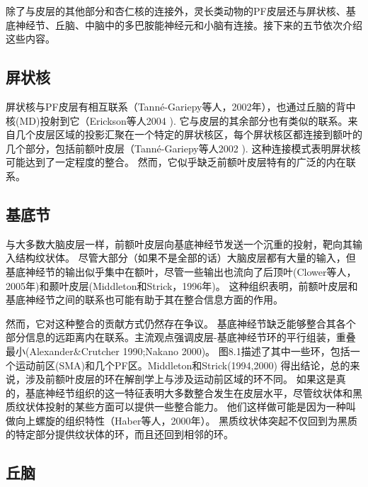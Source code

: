 除了与皮层的其他部分和杏仁核的连接外，灵长类动物的PF皮层还与屏状核、基底神经节、丘脑、中脑中的多巴胺能神经元和小脑有连接。接下来的五节依次介绍这些内容。



\subsection{屏状核}
\par

屏状核与PF皮层有相互联系（Tanné-Gariepy等人，2002年），也通过丘脑的背中核(MD)投射到它（Erickson等人2004 ). 它与皮层的其余部分也有类似的联系。来自几个皮层区域的投影汇聚在一个特定的屏状核区，每个屏状核区都连接到额叶的几个部分，包括前额叶皮层（Tanné-Gariepy等人2002 ). 这种连接模式表明屏状核可能达到了一定程度的整合。
然而，它似乎缺乏前额叶皮层特有的广泛的内在联系。



\subsection{基底节}
\par

与大多数大脑皮层一样，前额叶皮层向基底神经节发送一个沉重的投射，靶向其输入结构纹状体。
尽管大部分（如果不是全部的话）大脑皮层都有大量的输入，但基底神经节的输出似乎集中在额叶，尽管一些输出也流向了后顶叶(Clower等人，2005年)和颞叶皮层(Middleton和Strick，1996年)。
这种组织表明，前额叶皮层和基底神经节之间的联系也可能有助于其在整合信息方面的作用。
\par

然而，它对这种整合的贡献方式仍然存在争议。
基底神经节缺乏能够整合其各个部分信息的远距离内在联系。主流观点强调皮层-基底神经节环的平行组装，重叠最小(Alexander$\&$Crutcher 1990;Nakano 2000)。
图8.1描述了其中一些环，包括一个运动前区(SMA)和几个PF区。Middleton和Strick(1994,2000) 得出结论，总的来说，涉及前额叶皮层的环在解剖学上与涉及运动前区域的环不同。
如果这是真的，基底神经节组织的这一特征表明大多数整合发生在皮层水平，尽管纹状体和黑质纹状体投射的某些方面可以提供一些整合能力。
他们这样做可能是因为一种叫做向上螺旋的组织特性（Haber等人，2000年）。
黑质纹状体突起不仅回到为黑质的特定部分提供纹状体的环，而且还回到相邻的环。



\subsection{丘脑}
\par

